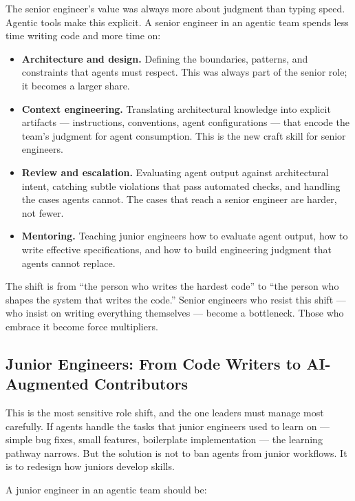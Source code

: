 \documentclass[
  a4paper,
  DIV=11,
  numbers=noendperiod]{scrreprt}
\providecommand{\tightlist}{%
  \setlength{\itemsep}{0pt}\setlength{\parskip}{0pt}}
\begin{document}
The senior engineer's value was always more about judgment than typing
speed. Agentic tools make this explicit. A senior engineer in an agentic
team spends less time writing code and more time on:

\begin{itemize}
\tightlist
\item
  \textbf{Architecture and design.} Defining the boundaries, patterns,
  and constraints that agents must respect. This was always part of the
  senior role; it becomes a larger share.
\item
  \textbf{Context engineering.} Translating architectural knowledge into
  explicit artifacts --- instructions, conventions, agent configurations
  --- that encode the team's judgment for agent consumption. This is the
  new craft skill for senior engineers.
\item
  \textbf{Review and escalation.} Evaluating agent output against
  architectural intent, catching subtle violations that pass automated
  checks, and handling the cases agents cannot. The cases that reach a
  senior engineer are harder, not fewer.
\item
  \textbf{Mentoring.} Teaching junior engineers how to evaluate agent
  output, how to write effective specifications, and how to build
  engineering judgment that agents cannot replace.
\end{itemize}

The shift is from ``the person who writes the hardest code'' to ``the
person who shapes the system that writes the code.'' Senior engineers
who resist this shift --- who insist on writing everything themselves
--- become a bottleneck. Those who embrace it become force multipliers.

\subsection{Junior Engineers: From Code Writers to AI-Augmented
Contributors}\label{junior-engineers-from-code-writers-to-ai-augmented-contributors}

This is the most sensitive role shift, and the one leaders must manage
most carefully. If agents handle the tasks that junior engineers used to
learn on --- simple bug fixes, small features, boilerplate
implementation --- the learning pathway narrows. But the solution is not
to ban agents from junior workflows. It is to redesign how juniors
develop skills.

A junior engineer in an agentic team should be:
\end{document}

